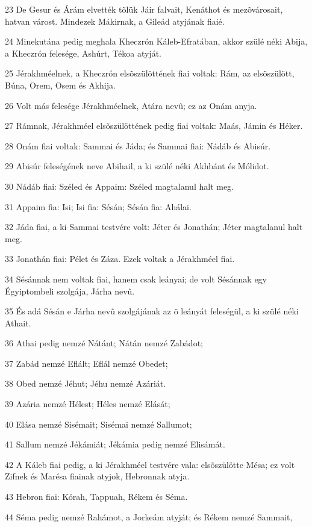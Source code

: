 \par 23 De Gesur és Árám elvették tõlük Jáir falvait, Kenáthot és mezõvárosait, hatvan várost. Mindezek Mákirnak, a Gileád atyjának fiaié.
\par 24 Minekutána pedig meghala Kheczrón Káleb-Efratában, akkor szülé néki Abija, a Kheczrón felesége, Ashúrt, Tékoa atyját.
\par 25 Jérakhméelnek, a Kheczrón elsõszülöttének fiai voltak: Rám, az elsõszülött, Búna, Orem, Osem és Akhija.
\par 26 Volt más felesége Jérakhméelnek, Atára nevû; ez az Onám anyja.
\par 27 Rámnak, Jérakhméel elsõszülöttének pedig fiai voltak: Maás, Jámin és Héker.
\par 28 Onám fiai voltak: Sammai és Jáda; és Sammai fiai: Nádáb és Abisúr.
\par 29 Abisúr feleségének neve Abihail, a ki szülé néki Akhbánt és Mólidot.
\par 30 Nádáb fiai: Széled és Appaim: Széled magtalanul halt meg.
\par 31 Appaim fia: Isi; Isi fia: Sésán; Sésán fia: Ahálai.
\par 32 Jáda fiai, a ki Sammai testvére volt: Jéter és Jonathán; Jéter magtalanul halt meg.
\par 33 Jonathán fiai: Pélet és Záza. Ezek voltak a Jérakhméel fiai.
\par 34 Sésánnak nem voltak fiai, hanem csak leányai; de volt Sésánnak egy Égyiptombeli szolgája, Járha nevû.
\par 35 És adá Sésán e Járha nevû szolgájának az õ leányát feleségül, a ki szülé néki Athait.
\par 36 Athai pedig nemzé Nátánt; Nátán nemzé Zabádot;
\par 37 Zabád nemzé Eflált; Eflál nemzé Obedet;
\par 38 Obed nemzé Jéhut; Jéhu nemzé Azáriát.
\par 39 Azária nemzé Hélest; Héles nemzé Elását;
\par 40 Elása nemzé Sisémait; Sisémai nemzé Sallumot;
\par 41 Sallum nemzé Jékámiát; Jékámia pedig nemzé Elisámát.
\par 42 A Káleb fiai pedig, a ki Jérakhméel testvére vala: elsõszülötte Mésa; ez volt Zifnek és Marésa fiainak atyjok, Hebronnak atyja.
\par 43 Hebron fiai: Kórah, Tappuah, Rékem és Séma.
\par 44 Séma pedig nemzé Rahámot, a Jorkeám atyját; és Rékem nemzé Sammait,

